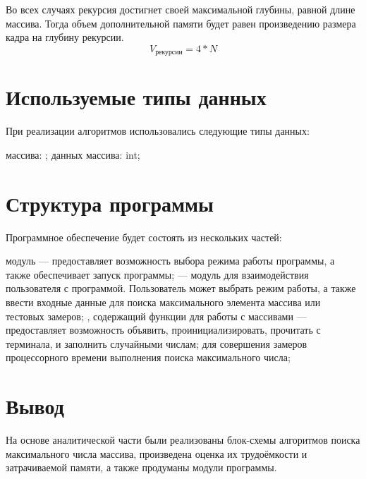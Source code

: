 Во всех случаях рекурсия достигнет своей максимальной глубины, равной длине массива. Тогда объем дополнительной памяти будет равен произведению размера кадра на глубину рекурсии.
 \begin{equation}
 	V_{\text{рекурсии}} = 4 * N
 \end{equation}
 


\section{Используемые типы данных}
При реализации алгоритмов использовались следующие типы данных:
\begin{itemize}
	 массива: ;
	 данных массива: int;
\end{itemize}


\section{Структура программы}
Программное обеспечение будет состоять из нескольких частей:
\begin{itemize}
	 модуль — предоставляет возможность выбора режима работы программы, а также обеспечивает запуск программы;
	 — модуль для взаимодействия пользователя с программой. Пользователь может выбрать режим работы, а также ввести входные данные для поиска максимального элемента массива или тестовых замеров;
	, содержащий функции для работы с массивами — предоставляет возможность объявить, проинициализировать, прочитать с терминала, и заполнить случайными числам;
	 для совершения замеров процессорного времени выполнения поиска максимального числа;
\end{itemize}

\section*{Вывод}
На основе аналитической части были реализованы блок-схемы алгоритмов поиска максимального числа массива, произведена оценка их трудоёмкости и затрачиваемой памяти, а также продуманы модули программы.
\clearpage
